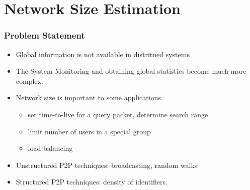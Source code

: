 \documentclass[red]{beamer}
\begin{document}
\section{Network Size Estimation}

\begin{frame}
\frametitle{Problem Statement}
\begin{itemize}
\item Global information is not available in distritued systems
\item The System Monitoring and obtaining global statistics
become much more complex.
\item Network size is important to some applications.
\begin{itemize}
\item set time-to-live for a query packet, determine search range
\item limit number of users in a special group
\item load balancing
\end{itemize}
\item Unstructured P2P techniques: broadcasting, random walks
\item Structured P2P techniques: density of identifiers.
\end{itemize}
\end{frame}

\end{document}
